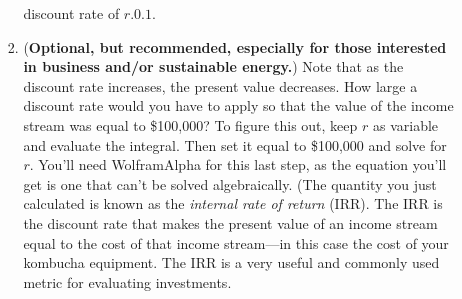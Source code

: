 \documentclass[12pt]{article}
\begin{document}
\begin{itemize}
\begin{enumerate}
\begin{enumerate}
       discount rate of $r.0.1$.
     \item ({\bf Optional, but recommended, especially for those
       interested in business and/or sustainable energy.})  Note that
       as the discount rate increases, the present value decreases.
       How large a discount rate would you have to apply so that the
       value of the income stream was equal to \$100,000?  To figure
       this out, keep $r$ as variable and evaluate the integral.
       Then set it equal to \$100,000 and solve for $r$.  You'll need
       WolframAlpha for this last step, as the equation you'll get is
       one that can't be solved algebraically.  (The quantity you just
       calculated is known as the \emph{internal rate of return}
       (IRR). The IRR is the discount rate that makes the present
       value of an income stream equal to the cost of that income
       stream---in this case the cost of your kombucha equipment.  The
       IRR is a very useful and commonly used metric for evaluating
       investments. 
  \end{enumerate}
  \end{enumerate}
\end{itemize}
\end{document}
